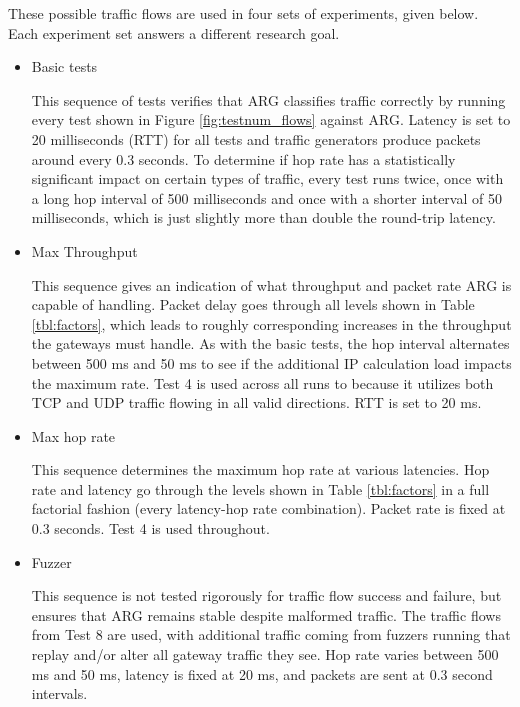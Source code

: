 \par These possible traffic flows are used in four sets of experiments, given below. Each experiment set answers a different research goal.
\begin{itemize}
	\item Basic tests
	\par This sequence of tests verifies that \ac{ARG} classifies traffic correctly by running every test shown in Figure \ref{fig:testnum_flows} against \ac{ARG}. Latency is set to 20 milliseconds (\ac{RTT}) for all tests and traffic generators produce packets around every 0.3 seconds. To determine if hop rate has a statistically significant impact on certain types of traffic, every test runs twice, once with a long hop interval of 500 milliseconds and once with a shorter interval of 50 milliseconds, which is just slightly more than double the round-trip latency.

	\item Max Throughput
	\par This sequence gives an indication of what throughput and packet rate \ac{ARG} is capable of handling. Packet delay goes through all levels shown in Table \ref{tbl:factors}, which leads to roughly corresponding increases in the throughput the gateways must handle. As with the basic tests, the hop interval alternates between 500 ms and 50 ms to see if the additional \ac{IP} calculation load impacts the maximum rate. Test 4 is used across all runs to because it utilizes both \ac{TCP} and \ac{UDP} traffic flowing in all valid directions. \ac{RTT} is set to 20 ms.

	\item Max hop rate
	\par This sequence determines the maximum hop rate at various latencies. Hop rate and latency go through the levels shown in Table \ref{tbl:factors} in a full factorial fashion (every latency-hop rate combination). Packet rate is fixed at 0.3 seconds. Test 4 is used throughout.

	\item Fuzzer
	\par This sequence is not tested rigorously for traffic flow success and failure, but ensures that \ac{ARG} remains stable despite malformed traffic. The traffic flows from Test 8 are used, with additional traffic coming from fuzzers running that replay and/or alter all gateway traffic they see. Hop rate varies between 500 ms and 50 ms, latency is fixed at 20 ms, and packets are sent at 0.3 second intervals.
\end{itemize}

